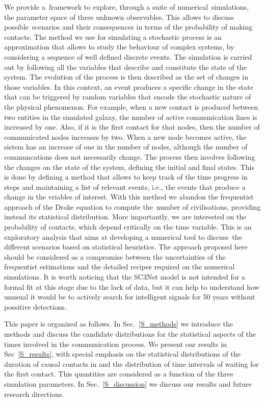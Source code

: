 \documentclass[crop]{CSLB}
\begin{document}
We provide a framework to explore, through a suite of
numerical simulations, the parameter space of three unknown
observables.
%
This allows to discuss possible scenarios and their consequences in
terms of the probability of making contacts.
%
The method we use for simulating a stochastic process is an
approximation that allows to study the behaviour of complex systems,
by considering a sequence of well defined discrete events.
%
The simulation is carried out by following all the variables that
describe and constitute the state of the system.
%
The evolution of the process is then described as the set of changes
in those variables. 
%
In this context, an event produces a specific change in the state that
can be triggered by random variables that encode the stochastic nature
of the physical phenomenon.
%
For example, when a new contact is produced between two entities in
the simulated galaxy, the number of active communication lines is
increased by one.
%
Also, if it is the first contact for that nodes, then the number of
communicated nodes increases by two.
%
When a new node becomes active, the sistem has an increase of one in
the number of nodes, although the number of communcations does not
necessarily change.
%
The process then involves following the changes on the state of the
system, defining the initial and final states.
%
This is done by defining a method that allows to keep track of the
time progress in steps and maintaining a list of relevant events,
i.e., the events that produce a change in the vriables of interest.
%
With this method we abandon the frequentist approach of the Drake
equation to compute the number of civilisations, providing instead its
statistical distribution.
%
More importantly, we are interested on the probability of contacts,
which depend critically on the time variable.
%
This is an exploratory analysis that aims at developing a numerical
tool to discuss the different scenarios based on statistical
heuristics.
%
The approach proposed here should be considered as a compromise
between the uncertainties of the frequentist estimations and the
detailed recipes required on the numerical simulations.
%
It is worth noticing that the SC3Net model is not intended for a
formal fit at this stage due to the lack of data, but it can help to
understand how unusual it would be to actively search for intelligent
signals for 50 years without possitive detections.


This paper is organized as follows.
%
In Sec.~\ref{S_methods} we introduce the methods and discuss the
candidate distributions for the statistical aspects of the times
involved in the communication process.
%
We present our results in Sec~\ref{S_results}, with special emphasis
on the statistical distributions of the duration of causal contacts in
and the distribution of time intervals of waiting for the first contact.
%
This quantities are considered as a function of the three simulation
parameters.
%
In Sec.~\ref{S_discussion} we discuss our results and future research
directions.   
\end{document}
